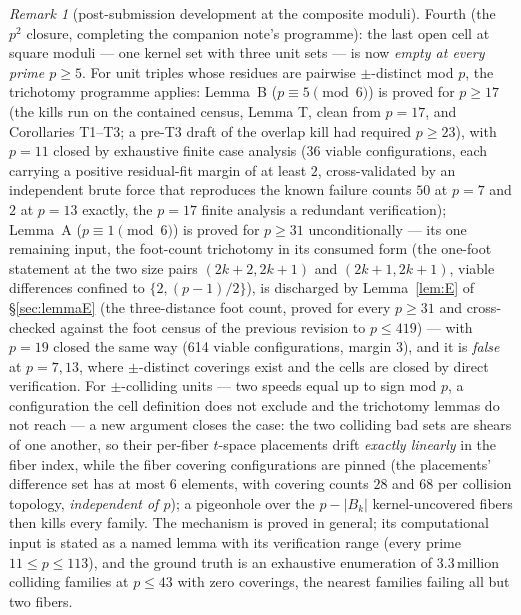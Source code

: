 \documentclass[11pt,a4paper]{article}
\numberwithin{equation}{section}
\theoremstyle{plain}
\theoremstyle{definition}
\theoremstyle{remark}
\newtheorem{remark}[theorem]{Remark}
\begin{document}
\begin{remark}[post-submission development at the composite moduli]
\medskip
Fourth (the $p^2$ closure, completing the companion note's programme):
the last open cell at square moduli --- one kernel set with three unit
sets --- is now \emph{empty at every prime $p\ge5$}.  For unit triples
whose residues are pairwise $\pm$-distinct mod $p$, the trichotomy
programme applies: Lemma~B ($p\equiv5\pmod6$) is proved for $p\ge17$
(the kills run on the contained census, Lemma T, clean from $p=17$, and
Corollaries T1--T3; a pre-T3 draft of the overlap kill had required
$p\ge23$), with $p=11$ closed by exhaustive finite case analysis (36
viable configurations, each carrying a positive residual-fit margin of at
least $2$, cross-validated by an independent brute force that reproduces
the known failure counts $50$ at $p=7$ and $2$ at $p=13$ exactly, the
$p=17$ finite analysis a redundant
verification); Lemma~A ($p\equiv1\pmod6$) is proved for $p\ge31$
unconditionally --- its one remaining input, the foot-count trichotomy
in its consumed form (the one-foot statement at the two size pairs
$(2k{+}2,2k{+}1)$ and $(2k{+}1,2k{+}1)$, viable differences confined to
$\{2,(p-1)/2\}$), is discharged by Lemma~\ref{lem:E} of
\S\ref{sec:lemmaE} (the three-distance foot count, proved for every
$p\ge31$ and cross-checked against the foot census of the previous
revision to $p\le419$) --- with $p=19$ closed the same way (614
viable configurations, margin $3$), and it is \emph{false} at $p=7,13$,
where $\pm$-distinct coverings exist and the cells are closed by direct
verification. For $\pm$-colliding units ---
two speeds equal up to sign mod $p$, a configuration the cell definition
does not exclude and the trichotomy lemmas do not reach --- a new argument
closes the case: the two colliding bad sets are shears of one another, so
their per-fiber $t$-space placements drift \emph{exactly linearly} in the
fiber index, while the fiber covering configurations are pinned (the
placements' difference set has at most $6$ elements, with covering counts
$28$ and $68$ per collision topology, \emph{independent of $p$}); a
pigeonhole over the $p-|B_k|$ kernel-uncovered fibers then kills every
family.  The mechanism is proved in general; its computational input is
stated as a named lemma with its verification range (every prime
$11\le p\le 113$), and the ground truth is an exhaustive enumeration of
$3.3$\,million colliding families at $p\le43$ with zero coverings, the
nearest families failing all but two fibers.


\end{remark}
\end{document}
